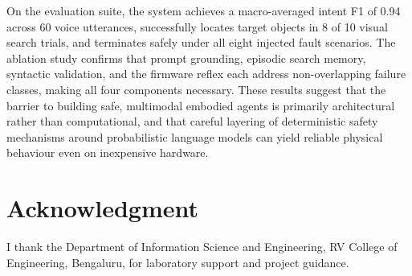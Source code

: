 \documentclass[conference]{IEEEtran}
\begin{document}
On the evaluation suite, the system achieves a macro-averaged intent F1 of 0.94 across 60 voice utterances, successfully locates target objects in 8 of 10 visual search trials, and terminates safely under all eight injected fault scenarios. The ablation study confirms that prompt grounding, episodic search memory, syntactic validation, and the firmware reflex each address non-overlapping failure classes, making all four components necessary. These results suggest that the barrier to building safe, multimodal embodied agents is primarily architectural rather than computational, and that careful layering of deterministic safety mechanisms around probabilistic language models can yield reliable physical behaviour even on inexpensive hardware.

\section*{Acknowledgment}

I thank the Department of Information Science and Engineering, RV College of Engineering, Bengaluru, for laboratory support and project guidance.
\end{document}

